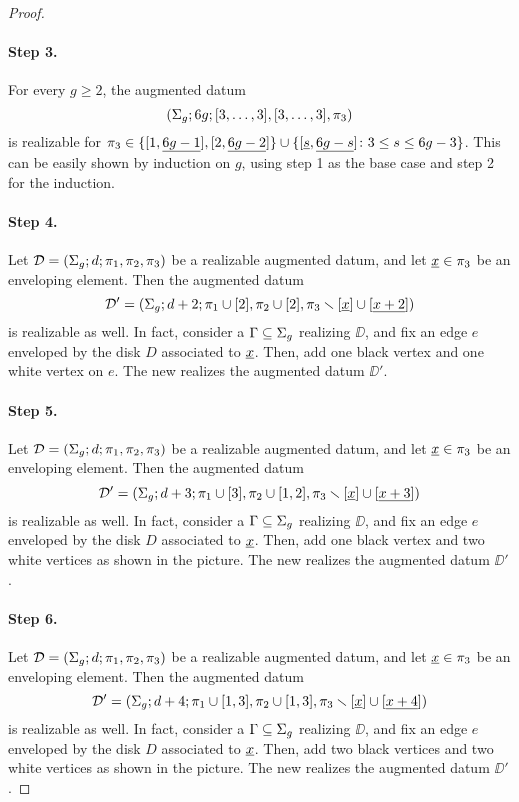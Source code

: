 \begin{proof}
\paragraph{Step 3.} For every $g\ge 2$, the augmented datum 
\[
(\Sigma_{g};6g;[3,\ldots,3],[3,\ldots,3],\pi_3)
\]
is realizable for $\pi_3\in\{[1,\underline{6g-1}],[2,\underline{6g-2}]\}\cup\{[\underline{s},\underline{6g-s}]\colon 3\le s\le 6g-3\}$. This can be easily shown by induction on $g$, using step 1 as the base case and step 2 for the induction.
\paragraph{Step 4.} Let $\mathcal{D}=(\Sigma_{g};d;\pi_1,\pi_2,\pi_3)$ be a realizable augmented datum, and let $\underline{x}\in\pi_3$ be an enveloping element. Then the augmented datum
\[
\mathcal{D}'=(\Sigma_{g};d+2;\pi_1\cup[2],\pi_2\cup[2],\pi_3\smallsetminus[\underline{x}]\cup[\underline{x+2}])
\]
is realizable as well. In fact, consider a \dessin{} $\Gamma\subseteq\Sigma_{g}$ realizing $\DD$, and fix an edge $e$ enveloped by the disk $D$ associated to $\underline{x}$. Then, add one black vertex and one white vertex on $e$. The new \dessin{} realizes the augmented datum $\DD'$.
\paragraph{Step 5.} Let $\mathcal{D}=(\Sigma_{g};d;\pi_1,\pi_2,\pi_3)$ be a realizable augmented datum, and let $\underline{x}\in\pi_3$ be an enveloping element. Then the augmented datum
\[
\mathcal{D}'=(\Sigma_{g};d+3;\pi_1\cup[3],\pi_2\cup[1,2],\pi_3\smallsetminus[\underline{x}]\cup[\underline{x+3}])
\]
is realizable as well. In fact, consider a \dessin{} $\Gamma\subseteq\Sigma_{g}$ realizing $\DD$, and fix an edge $e$ enveloped by the disk $D$ associated to $\underline{x}$. Then, add one black vertex and two white vertices as shown in the picture. The new \dessin{} realizes the augmented datum $\DD'$.
\paragraph{Step 6.} Let $\mathcal{D}=(\Sigma_{g};d;\pi_1,\pi_2,\pi_3)$ be a realizable augmented datum, and let $\underline{x}\in\pi_3$ be an enveloping element. Then the augmented datum
\[
\mathcal{D}'=(\Sigma_{g};d+4;\pi_1\cup[1,3],\pi_2\cup[1,3],\pi_3\smallsetminus[\underline{x}]\cup[\underline{x+4}])
\]
is realizable as well. In fact, consider a \dessin{} $\Gamma\subseteq\Sigma_{g}$ realizing $\DD$, and fix an edge $e$ enveloped by the disk $D$ associated to $\underline{x}$. Then, add two black vertices and two white vertices as shown in the picture. The new \dessin{} realizes the augmented datum $\DD'$.


\end{proof}
